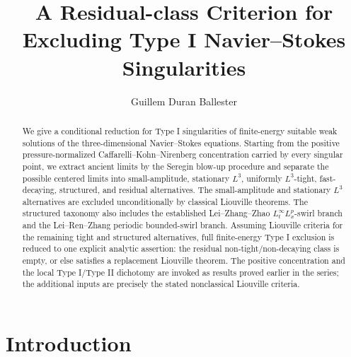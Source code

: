 \documentclass[11pt]{amsart}
\title[Seregin limits and Type I exclusion]{A Residual-class Criterion for Excluding Type I Navier--Stokes Singularities}
\author{Guillem Duran Ballester}
\date{}
\theoremstyle{plain}
\theoremstyle{definition}
\theoremstyle{remark}
\numberwithin{equation}{section}
\begin{document}
\begin{abstract}
We give a conditional reduction for Type I singularities of finite-energy
suitable weak solutions of the three-dimensional Navier--Stokes equations.
Starting from the positive pressure-normalized Caffarelli--Kohn--Nirenberg
concentration carried by every singular point, we extract ancient limits by
the Seregin blow-up procedure and separate the possible centered limits into
small-amplitude, stationary \(L^3\), uniformly \(L^3\)-tight, fast-decaying,
structured, and residual alternatives.  The small-amplitude and stationary
\(L^3\) alternatives are excluded unconditionally by classical Liouville
theorems.  The structured taxonomy also includes the established
Lei--Zhang--Zhao \(L_t^\infty L_x^p\)-swirl branch and the
Lei--Ren--Zhang periodic bounded-swirl branch.  Assuming Liouville criteria
for the remaining tight and structured alternatives, full finite-energy Type I
exclusion is reduced to one explicit analytic assertion: the residual
non-tight/non-decaying class is empty, or else satisfies a replacement
Liouville theorem.  The positive concentration and the local Type I/Type II
dichotomy are invoked as results proved earlier in the series; the additional
inputs are precisely the stated nonclassical Liouville criteria.
\end{abstract}

\maketitle

\section{Introduction}
\end{document}
